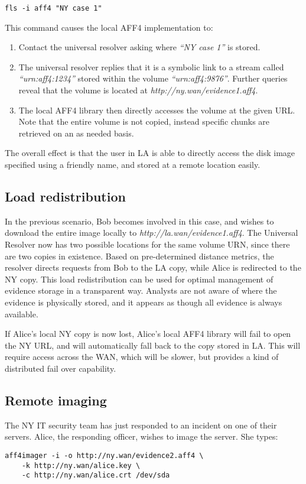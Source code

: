 \documentclass[10pt, conference]{IEEEtran}
\begin{document}
{{\begin{lstlisting}
fls -i aff4 "NY case 1"
\end{lstlisting}
This command causes the local AFF4 implementation to:
\begin{enumerate}
\item Contact the universal resolver asking where \emph{``NY case 1''} is
stored.
\item The universal resolver replies that it is a symbolic link to a
stream called \emph{``urn:aff4:1234''} stored within the volume
\emph{``urn:aff4:9876''}. Further queries reveal that the volume is
located at \emph{http://ny.wan/evidence1.aff4}.
\item The local AFF4 library then directly accesses the volume at the
given URL. Note that the entire volume is not copied, instead specific
chunks are retrieved on an as needed basis.
\end{enumerate}

The overall effect is that the user in LA is able to directly access
the disk image specified using a friendly name, and stored at a remote
location easily.

\subsection{Load redistribution}
In the previous scenario, Bob becomes involved in this case, and
wishes to download the entire image locally to
\emph{http://la.wan/evidence1.aff4}. The Universal Resolver now has
two possible locations for the same volume URN, since there are two
copies in existence. Based on pre-determined distance metrics, the
resolver directs requests from Bob to the LA copy, while Alice is
redirected to the NY copy. This load redistribution can be used for
optimal management of evidence storage in a transparent way. Analysts
are not aware of where the evidence is physically stored, and it
appears as though all evidence is always available.

If Alice's local NY copy is now lost, Alice's local AFF4 library will
fail to open the NY URL, and will automatically fall back to the copy
stored in LA. This will require access across the WAN, which will be
slower, but provides a kind of distributed fail over capability.

\subsection{Remote imaging}
The NY IT security team has just responded to an incident on one of
their servers. Alice, the responding officer, wishes to image the
server. She types:
\begin{lstlisting}
aff4imager -i -o http://ny.wan/evidence2.aff4 \
	-k http://ny.wan/alice.key \
	-c http://ny.wan/alice.crt /dev/sda
\end{lstlisting}

}}
\end{document}
